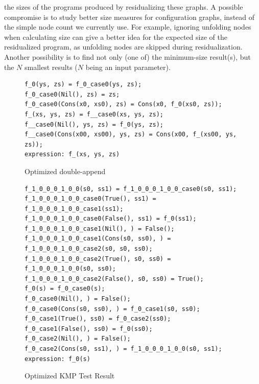 \documentclass[submission,copyright,creativecommons]{eptcs}
\begin{document}
\begin{itemize}
    the sizes of the programs produced by residualizing these graphs.
    A possible compromise is to study better size measures for configuration graphs, instead
    of the simple node count we currently use.
    For example, ignoring unfolding nodes when calculating size can give a better idea for the expected size
    of the residualized program, as unfolding nodes are skipped during residualization.
    Another possibility is to find not only (one of) the minimum-size result(s), but the $N$ smallest
    results ($N$ being an input parameter).
    
\end{itemize}

\begin{figure}
\begin{lstlisting}
f_0(ys, zs) = f_0_case0(ys, zs);
f_0_case0(Nil(), zs) = zs;
f_0_case0(Cons(x0, xs0), zs) = Cons(x0, f_0(xs0, zs));
f_(xs, ys, zs) = f__case0(xs, ys, zs);
f__case0(Nil(), ys, zs) = f_0(ys, zs);
f__case0(Cons(x00, xs00), ys, zs) = Cons(x00, f_(xs00, ys, zs));
expression: f_(xs, ys, zs)
\end{lstlisting}
\caption{Optimized double-append}
\label{fig:DoubleAppResult}
\end{figure}

\begin{figure}
\begin{lstlisting}
f_1_0_0_0_1_0_0(s0, ss1) = f_1_0_0_0_1_0_0_case0(s0, ss1);
f_1_0_0_0_1_0_0_case0(True(), ss1) = f_1_0_0_0_1_0_0_case1(ss1);
f_1_0_0_0_1_0_0_case0(False(), ss1) = f_0(ss1);
f_1_0_0_0_1_0_0_case1(Nil(), ) = False();
f_1_0_0_0_1_0_0_case1(Cons(s0, ss0), ) = f_1_0_0_0_1_0_0_case2(s0, s0, ss0);
f_1_0_0_0_1_0_0_case2(True(), s0, ss0) = f_1_0_0_0_1_0_0(s0, ss0);
f_1_0_0_0_1_0_0_case2(False(), s0, ss0) = True();
f_0(s) = f_0_case0(s);
f_0_case0(Nil(), ) = False();
f_0_case0(Cons(s0, ss0), ) = f_0_case1(s0, ss0);
f_0_case1(True(), ss0) = f_0_case2(ss0);
f_0_case1(False(), ss0) = f_0(ss0);
f_0_case2(Nil(), ) = False();
f_0_case2(Cons(s0, ss1), ) = f_1_0_0_0_1_0_0(s0, ss1);
expression: f_0(s)
\end{lstlisting}
\caption{Optimized KMP Test Result}
\label{fig:KMPResult}
\end{figure}
\end{document}

